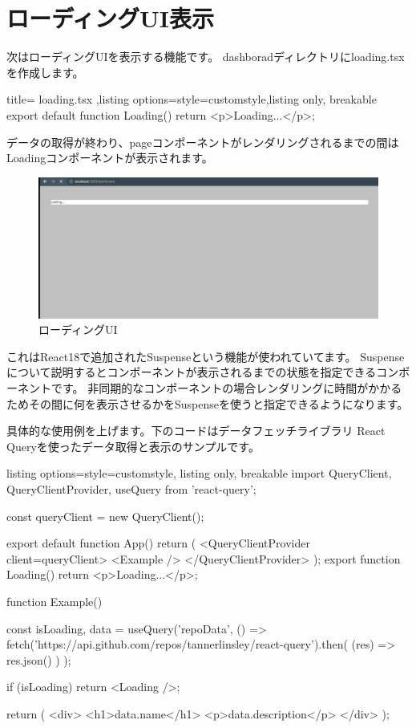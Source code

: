 \section{ローディングUI表示}

次はローディングUIを表示する機能です。
dashboradディレクトリにloading.tsxを作成します。

\begin{tcblisting}{title={
        loading.tsx
      },listing options={style=customstyle},listing only, breakable}
  export default function Loading() {
    return <p>Loading...</p>;
  }
\end{tcblisting}


データの取得が終わり、pageコンポーネントがレンダリングされるまでの間はLoadingコンポーネントが表示されます。

\begin{figure}[H]
  \centering
  \includegraphics[width=12cm]{./image/03-Tech/chap4/07.png}
  \caption{ローディングUI}
\end{figure}




これはReact18で追加されたSuspenseという機能が使われていてます。
Suspenseについて説明するとコンポーネントが表示されるまでの状態を指定できるコンポーネントです。
非同期的なコンポーネントの場合レンダリングに時間がかかるためその間に何を表示させるかをSuspenseを使うと指定できるようになります。

具体的な使用例を上げます。下のコードはデータフェッチライブラリ React Queryを使ったデータ取得と表示のサンプルです。






\begin{tcblisting}{listing options={style=customstyle}, listing only, breakable}
  import { QueryClient, QueryClientProvider, useQuery } from 'react-query';

  const queryClient = new QueryClient();

  export default function App() {
    return (
    <QueryClientProvider client={queryClient}>
    <Example />
    </QueryClientProvider>
    );
  }
  export function Loading() {
      return <p>Loading...</p>;
  }

  function Example() {
    const { isLoading, data } = useQuery('repoData', () =>
    fetch('https://api.github.com/repos/tannerlinsley/react-query').then(
    (res) => res.json()
    )
    );

    if (isLoading) return <Loading />;

    return (
      <div>
        <h1>{data.name}</h1>
        <p>{data.description}</p>
      </div>
    );
  }
\end{tcblisting}




